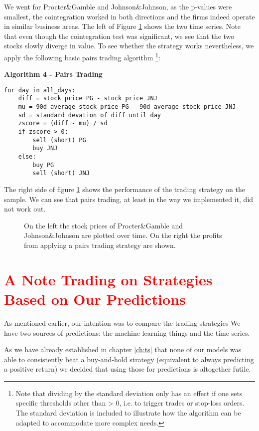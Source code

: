 We went for Procter\&Gamble and Johnson\&Johnson, as the p-values were smallest, the cointegration worked in both directions and the firms indeed operate in similar business areas. The left of Figure \ref{fig:coint_PG_JNJ} shows the two time series. Note that even though the cointegration test was significant, we see that the two stocks slowly diverge in value. To see whether the strategy works nevertheless, we apply the following basic pairs trading algorithm \footnote{Note that dividing by the standard deviation only has an effect if one sets specific thresholds other than > 0, i.e. to trigger trades or stop-loss orders. The standard deviation is included to illustrate how the algorithm can be adapted to accommodate more complex needs.}: 

\vspace{2ex}
\textbf{\small{Algorithm 4 - Pairs Trading}}
\vspace{-1ex}
\begin{verbatim}
for day in all_days: 
    diff = stock price PG - stock price JNJ
    mu = 90d average stock price PG - 90d average stock price JNJ
    sd = standard devation of diff until day
    zscore = (diff - mu) / sd
    if zscore > 0:
        sell (short) PG
        buy JNJ
    else:
        buy PG
        sell (short) JNJ
\end{verbatim}

The right side of figure \ref{fig:coint_PG_JNJ} shows the performance of the trading strategy on the sample. We can see that pairs trading, at least in the way we implemented it, did not work out. 

\begin{figure}[h!]
    \centering
    \begin{adjustbox}{width=.95\textwidth,center}
        
        
    \end{adjustbox}  
    \caption{On the left the stock prices of Procter\&Gamble and Johnson\&Johnson are plotted over time. On the right the profits from applying a pairs trading strategy are shown.}
    \label{fig:coint_PG_JNJ}
\end{figure}{}

\section{\textcolor{red}{A Note Trading on Strategies Based on Our Predictions}}
As mentioned earlier, our intention was to compare the trading strategies 
We have two sources of predictions: the machine learning things and the time series. 

As we have already established in chapter \ref{ch:ts} that none of our models was able to consistently beat a buy-and-hold strategy (equivalent to always predicting a positive return) we decided that using those for predictions is altogether futile. 




